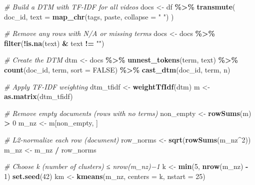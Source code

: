 \documentclass[
]{article}
\newenvironment{Shaded}{\begin{snugshade}}{\end{snugshade}}
\newcommand{\AttributeTok}[1]{\textcolor[rgb]{0.13,0.29,0.53}{#1}}
\newcommand{\CommentTok}[1]{\textcolor[rgb]{0.56,0.35,0.01}{\textit{#1}}}
\newcommand{\ConstantTok}[1]{\textcolor[rgb]{0.56,0.35,0.01}{#1}}
\newcommand{\DecValTok}[1]{\textcolor[rgb]{0.00,0.00,0.81}{#1}}
\newcommand{\FunctionTok}[1]{\textcolor[rgb]{0.13,0.29,0.53}{\textbf{#1}}}
\newcommand{\NormalTok}[1]{#1}
\newcommand{\OtherTok}[1]{\textcolor[rgb]{0.56,0.35,0.01}{#1}}
\newcommand{\SpecialCharTok}[1]{\textcolor[rgb]{0.81,0.36,0.00}{\textbf{#1}}}
\newcommand{\StringTok}[1]{\textcolor[rgb]{0.31,0.60,0.02}{#1}}
\begin{document}
\begin{Shaded}
\begin{Highlighting}[]
\CommentTok{\# Build a DTM with TF{-}IDF for all videos}
\NormalTok{docs }\OtherTok{\textless{}{-}}\NormalTok{ df }\SpecialCharTok{\%\textgreater{}\%}
  \FunctionTok{transmute}\NormalTok{(}
\NormalTok{    doc\_id,}
    \AttributeTok{text =} \FunctionTok{map\_chr}\NormalTok{(tags, paste, }\AttributeTok{collapse =} \StringTok{" "}\NormalTok{)}
\NormalTok{  )}

\CommentTok{\# Remove any rows with N/A or missing terms}
\NormalTok{docs }\OtherTok{\textless{}{-}}\NormalTok{ docs }\SpecialCharTok{\%\textgreater{}\%} \FunctionTok{filter}\NormalTok{(}\SpecialCharTok{!}\FunctionTok{is.na}\NormalTok{(text) }\SpecialCharTok{\&}\NormalTok{ text }\SpecialCharTok{!=} \StringTok{""}\NormalTok{)}

\CommentTok{\# Create the DTM}
\NormalTok{dtm }\OtherTok{\textless{}{-}}\NormalTok{ docs }\SpecialCharTok{\%\textgreater{}\%}
  \FunctionTok{unnest\_tokens}\NormalTok{(term, text) }\SpecialCharTok{\%\textgreater{}\%}
  \FunctionTok{count}\NormalTok{(doc\_id, term, }\AttributeTok{sort =} \ConstantTok{FALSE}\NormalTok{) }\SpecialCharTok{\%\textgreater{}\%}
  \FunctionTok{cast\_dtm}\NormalTok{(doc\_id, term, n)}

\CommentTok{\# Apply TF{-}IDF weighting}
\NormalTok{dtm\_tfidf }\OtherTok{\textless{}{-}} \FunctionTok{weightTfIdf}\NormalTok{(dtm)}
\NormalTok{m }\OtherTok{\textless{}{-}} \FunctionTok{as.matrix}\NormalTok{(dtm\_tfidf)}

\CommentTok{\# Remove empty documents (rows with no terms)}
\NormalTok{non\_empty }\OtherTok{\textless{}{-}} \FunctionTok{rowSums}\NormalTok{(m) }\SpecialCharTok{\textgreater{}} \DecValTok{0}
\NormalTok{m\_nz }\OtherTok{\textless{}{-}}\NormalTok{ m[non\_empty, ]}

\CommentTok{\# L2{-}normalize each row (document)}
\NormalTok{row\_norms }\OtherTok{\textless{}{-}} \FunctionTok{sqrt}\NormalTok{(}\FunctionTok{rowSums}\NormalTok{(m\_nz}\SpecialCharTok{\^{}}\DecValTok{2}\NormalTok{))}
\NormalTok{m\_nz }\OtherTok{\textless{}{-}}\NormalTok{ m\_nz }\SpecialCharTok{/}\NormalTok{ row\_norms}

\CommentTok{\# Choose k (number of clusters) ≤ nrow(m\_nz)−1}
\NormalTok{k }\OtherTok{\textless{}{-}} \FunctionTok{min}\NormalTok{(}\DecValTok{5}\NormalTok{, }\FunctionTok{nrow}\NormalTok{(m\_nz) }\SpecialCharTok{{-}} \DecValTok{1}\NormalTok{)}
\FunctionTok{set.seed}\NormalTok{(}\DecValTok{42}\NormalTok{)}
\NormalTok{km }\OtherTok{\textless{}{-}} \FunctionTok{kmeans}\NormalTok{(m\_nz, }\AttributeTok{centers =}\NormalTok{ k, }\AttributeTok{nstart =} \DecValTok{25}\NormalTok{)}


\end{Highlighting}
\end{Shaded}
\end{document}

